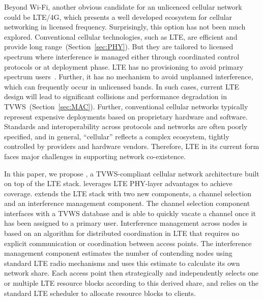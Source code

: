 Beyond Wi-Fi, another obvious candidate for an unlicenced cellular network could be LTE/4G, which presents a well developed ecosystem for cellular networking in licensed frequency. 
Surprisingly, this option has not been much explored. 
Conventional cellular technologies, such as LTE, are efficient and provide long range~(Section~\ref{sec:PHY}). 
But they are tailored to licensed spectrum where interference is managed either through coordinated control protocols or at deployment phase. 
LTE has no provisioning to avoid primary spectrum users~\cite{etsi_tvws}. 
Further, it has no mechanism to avoid unplanned interference, which can frequently occur in unlicensed bands.
In such cases, current LTE design will lead to significant collisions and performance degradation in TVWS~(Section~\ref{sec:MAC}).  
Further, conventional cellular networks typically represent expensive deployments based on proprietary hardware and software.
Standards and interoperability across protocols and networks are often poorly specified, 
and in general, ``cellular'' reflects a complex ecosystem, tightly controlled by providers and hardware vendors. 
Therefore, LTE in its current form faces major challenges in supporting network co-existence. 



In this paper, we propose {\em \cf}, a TVWS-compliant cellular network architecture built on top of the LTE stack. 
\cf leverages LTE PHY-layer advantages to achieve coverage. 
\cf extends the LTE stack with two new components, a channel selection and an interference management component. 
The channel selection component interfaces with a TVWS database and is able to quickly vacate a channel once it has been assigned to a primary user. 
Interference management across \cf nodes is based on an algorithm 
 for distributed coordination in LTE that requires no explicit communication or coordination between access points.
The interference management component estimates the number of contending nodes using standard LTE radio mechanisms and uses this estimate to calculate its own network share. Each access point then strategically and independently selects one or multiple LTE resource blocks according to this derived share, 
and relies on the standard LTE scheduler to allocate resource blocks to clients.  



